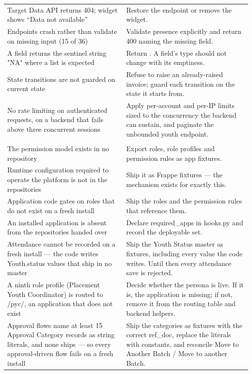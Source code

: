 \documentclass[10pt,a4paper]{article}
\makeatletter
\newcommand{\display}{\sffamily}
\newcommand{\code}[1]{{\ttfamily #1}}
\newcommand{\grp}[1]{\multicolumn{2}{@{}l}{\display\small\bfseries\color{amber}#1}\\[0.15em]}
\makeatother
\begin{document}
{\begin{xltabular}{\textwidth}{@{}P{7.1cm}L@{}}
Target Data API returns 404; widget shows ``Data not available''
& Restore the endpoint or remove the widget. \\
Endpoints crash rather than validate on missing input (15 of 36)
& Validate presence explicitly and return 400 naming the missing field. \\
A field returns the sentinel string \code{"NA"} where a list is expected
& Return \code{[]}. A field's type should not change with its emptiness. \\
State transitions are not guarded on current state
& Refuse to raise an already-raised invoice; guard each transition on the state it starts from. \\
No rate limiting on authenticated requests, on a backend that fails above three concurrent sessions
& Apply per-account and per-IP limits sized to the concurrency the backend can sustain, and paginate the unbounded youth endpoint. \\
\addlinespace[0.35em]
\grp{Configuration and handover — 7}
The permission model exists in no repository
& Export roles, role profiles and permission rules as app fixtures. \\
Runtime configuration required to operate the platform is not in the repositories
& Ship it as Frappe fixtures — the mechanism exists for exactly this. \\
Application code gates on roles that do not exist on a fresh install
& Ship the roles and the permission rules that reference them. \\
An installed application is absent from the repositories handed over
& Declare \code{required\_apps} in \code{hooks.py} and record the deployable set. \\
Attendance cannot be recorded on a fresh install — the code writes \code{Youth.status} values that ship in no master
& Ship the \code{Youth Status} master as fixtures, including every value the code writes. Until then every attendance save is rejected. \\
A ninth role profile (\code{Placement Youth Coordinator}) is routed to \code{/pyc/}, an application that does not exist
& Decide whether the persona is live. If it is, the application is missing; if not, remove it from the routing table and backend helpers. \\
Approval flows name at least 15 \code{Approval Category} records as string literals, and none ships — so every approval-driven flow fails on a fresh install
& Ship the categories as fixtures with the correct \code{ref\_doc}, replace the literals with constants, and reconcile \code{Move to Another Batch} / \code{Move to another Batch}. \\

\end{xltabular}}
\end{document}
